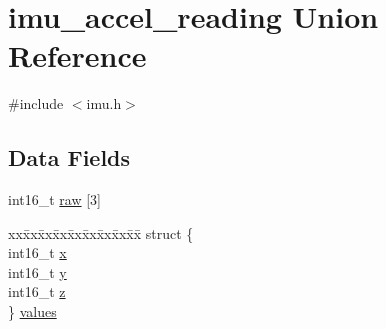 \hypertarget{unionimu__accel__reading}{\section{imu\+\_\+accel\+\_\+reading Union Reference}
\label{unionimu__accel__reading}
}


{\ttfamily \#include $<$imu.\+h$>$}

\subsection*{Data Fields}
\begin{DoxyCompactItemize}
\item 
int16\+\_\+t \hyperlink{unionimu__accel__reading_af2fa3ca97b1c0128041a0995b4f03a55}{raw} \mbox{[}3\mbox{]}
\item 
\begin{tabbing}
xx\=xx\=xx\=xx\=xx\=xx\=xx\=xx\=xx\=\kill
struct \{\\
\>int16\_t \hyperlink{unionimu__accel__reading_a410f30773523e81621eb5239b2179802}{x}\\
\>int16\_t \hyperlink{unionimu__accel__reading_af2b80bdf824780e1bb0c09254d4549f7}{y}\\
\>int16\_t \hyperlink{unionimu__accel__reading_aba2563f1a7d3e3ca745b21ffecb10429}{z}\\
\} \hyperlink{unionimu__accel__reading_a305b8c3cad9bae0cef2e382b6ba77b1a}{values}\\

\end{tabbing}\end{DoxyCompactItemize}


